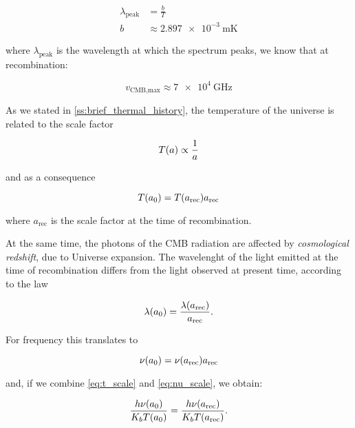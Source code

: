 \begin{align}
        \lambda_{\text{peak}} & = \frac{b}{T} \\
        b & \approx \SI{2.897e-3}{\meter\kelvin}
\end{align}

where $\lambda_{\text{peak}}$ is the wavelength at which the spectrum
peaks, we know that at recombination:

\begin{equation}
        v_{\text{CMB,max}} \approx \SI{7e4}{\giga\hertz}
\end{equation}

As we stated in \autoref{ss:brief_thermal_history}, the temperature of the
universe is related to the scale factor

\begin{equation}
        T\qty(a) \propto \frac{1}{a}
\end{equation}

and as a consequence

\begin{equation}
        T\qty(a_0) = T\qty(a_{\text{rec}}) a_{\text{rec}}
        \label{eq:t_scale}
\end{equation}

where $a_{\text{rec}}$ is the scale factor at the time of recombination.

At the same time, the photons of the CMB radiation are affected by \emph{cosmological
redshift}, due to Universe expansion. The wavelenght of the light emitted
at the time of recombination differs from the light observed at present
time, according to the law

\begin{equation}
        \lambda\qty(a_0) = \frac{\lambda\qty(a_{\text{rec}})}{a_{\text{rec}}}.
\end{equation}

For frequency this translates to

\begin{equation}
        \nu\qty(a_0) = \nu\qty(a_{\text{rec}}) a_{\text{rec}}
        \label{eq:nu_scale}
\end{equation}

and, if we combine \autoref{eq:t_scale} and \autoref{eq:nu_scale}, we
obtain:

\begin{equation}
        \frac{h \nu\qty(a_0)}{K_b T\qty(a_0)} =
        \frac{h \nu\qty(a_{\text{rec}})}{K_b T\qty(a_{\text{rec}})}.
\end{equation}

